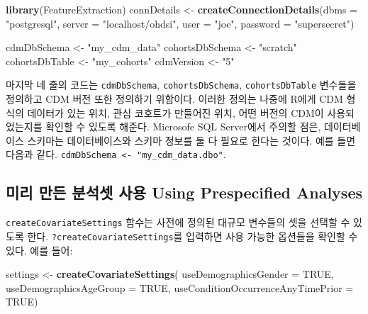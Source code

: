 \documentclass[11pt]{book}
\newenvironment{Shaded}{\begin{snugshade}}{\end{snugshade}}
\newcommand{\KeywordTok}[1]{\textcolor[rgb]{0.13,0.29,0.53}{\textbf{#1}}}
\newcommand{\DataTypeTok}[1]{\textcolor[rgb]{0.13,0.29,0.53}{#1}}
\newcommand{\StringTok}[1]{\textcolor[rgb]{0.31,0.60,0.02}{#1}}
\newcommand{\OtherTok}[1]{\textcolor[rgb]{0.56,0.35,0.01}{#1}}
\newcommand{\NormalTok}[1]{#1}
\theoremstyle{definition}
\theoremstyle{definition}
\theoremstyle{definition}
\theoremstyle{remark}
\begin{document}
\begin{Shaded}
\begin{Highlighting}[]
\KeywordTok{library}\NormalTok{(FeatureExtraction)}
\NormalTok{connDetails <-}\StringTok{ }\KeywordTok{createConnectionDetails}\NormalTok{(}\DataTypeTok{dbms =} \StringTok{"postgresql"}\NormalTok{,}
                                       \DataTypeTok{server =} \StringTok{"localhost/ohdsi"}\NormalTok{,}
                                       \DataTypeTok{user =} \StringTok{"joe"}\NormalTok{,}
                                       \DataTypeTok{password =} \StringTok{"supersecret"}\NormalTok{)}

\NormalTok{cdmDbSchema <-}\StringTok{ "my_cdm_data"}
\NormalTok{cohortsDbSchema <-}\StringTok{ "scratch"}
\NormalTok{cohortsDbTable <-}\StringTok{ "my_cohorts"}
\NormalTok{cdmVersion <-}\StringTok{ "5"}
\end{Highlighting}
\end{Shaded}

마지막 네 줄의 코드는 \texttt{cdmDbSchema}, \texttt{cohortsDbSchema},
\texttt{cohortsDbTable} 변수들을 정의하고 CDM 버전 또한 정의하기
위함이다. 이러한 정의는 나중에 R에게 CDM 형식의 데이터가 있는 위치, 관심
코호트가 만들어진 위치, 어떤 버전의 CDM이 사용되었는지를 확인할 수
있도록 해준다. Microsofe SQL Server에서 주의할 점은, 데이터베이스
스키마는 데이터베이스와 스키마 정보를 둘 다 필요로 한다는 것이다. 예를
들면 다음과 같다.
\texttt{cdmDbSchema\ \textless{}-\ "my\_cdm\_data.dbo"}.

\subsection{미리 만든 분석셋 사용 Using Prespecified
Analyses}\label{----using-prespecified-analyses}

\texttt{createCovariateSettings} 함수는 사전에 정의된 대규모 변수들의
셋을 선택할 수 있도록 한다. \texttt{?createCovariateSettings}를 입력하면
사용 가능한 옵션들을 확인할 수 있다. 예를 들어:

\begin{Shaded}
\begin{Highlighting}[]
\NormalTok{settings <-}\StringTok{ }\KeywordTok{createCovariateSettings}\NormalTok{(}
  \DataTypeTok{useDemographicsGender =} \OtherTok{TRUE}\NormalTok{, }
  \DataTypeTok{useDemographicsAgeGroup =} \OtherTok{TRUE}\NormalTok{, }
  \DataTypeTok{useConditionOccurrenceAnyTimePrior =} \OtherTok{TRUE}\NormalTok{) }
\end{Highlighting}
\end{Shaded}
\end{document}
